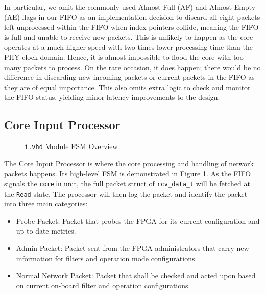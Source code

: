 \documentclass[a4paper]{report}
\newcommand{\code}{\texttt}
\begin{document}
In particular, we omit the commonly used Almost Full (AF) and Almost Empty (AE) flags in our FIFO as an implementation decision to discard all eight packets left unprocessed within the FIFO when index pointers collide, meaning the FIFO is full and unable to receive new packets. This is unlikely to happen as the core operates at a much higher speed with two times lower processing time than the PHY clock domain. Hence, it is almost impossible to flood the core with too many packets to process. On the rare occasion, it does happen; there would be no difference in discarding new incoming packets or current packets in the FIFO as they are of equal importance. This also omits extra logic to check and monitor the FIFO status, yielding minor latency improvements to the design.

\subsection{Core Input Processor}

\begin{figure}[h!]
  \caption{\code{i.vhd} Module FSM Overview}
  \label{fig:corein-fsm}
\end{figure}

The Core Input Processor is where the core processing and handling of network packets happens. Its high-level FSM is demonstrated in Figure \ref{fig:corein-fsm}. As the FIFO signals the \code{corein} unit, the full packet struct of \code{rcv\_data\_t} will be fetched at the \code{Read} state. The processor will then log the packet and identify the packet into three main categories:
\begin{itemize}
    \item Probe Packet: Packet that probes the FPGA for its current configuration and up-to-date metrics.
    \item Admin Packet: Packet sent from the FPGA administrators that carry new information for filters and operation mode configurations.
    \item Normal Network Packet: Packet that shall be checked and acted upon based on current on-board filter and operation configurations.
\end{itemize}
\end{document}
